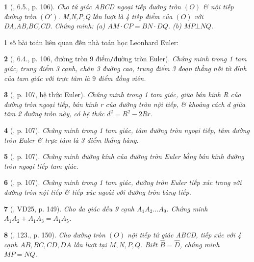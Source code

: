 \documentclass{article}
\newtheorem{baitoan}{}
\begin{document}
\begin{baitoan}[\cite{Binh_boi_duong_Toan_9_tap_2}, 6.5., p. 106]
	Cho tứ giác ABCD ngoại tiếp đường tròn $(O)$ \& nội tiếp đường tròn $(O')$. M,N,P,Q lần lượt là 4 tiếp điểm của $(O)$ với DA,AB,BC,CD. Chứng minh: (a) $AM\cdot CP = BN\cdot DQ$. (b) $MP\bot NQ$.
\end{baitoan}
1 số bài toán liên quan đến nhà toán học Leonhard Euler:

\begin{baitoan}[\cite{Binh_boi_duong_Toan_9_tap_2}, 6.4., p. 106, đường tròn 9 điểm{\tt/}đường tròn Euler]
	Chứng minh trong 1 tam giác, trung điểm 3 cạnh, chân 3 đường cao, trung điểm 3 đoạn thẳng nối từ đỉnh của tam giác với trực tâm là $9$ điểm đồng viên.
\end{baitoan}

\begin{baitoan}[\cite{Binh_boi_duong_Toan_9_tap_2}, p. 107, hệ thức Euler]
	Chứng minh trong 1 tam giác, giữa bán kính R của đường tròn ngoại tiếp, bán kính r của đường tròn nội tiếp, \& khoảng cách d giữa tâm 2 đường tròn này, có hệ thức $d^2 = R^2 - 2Rr$.
\end{baitoan}

\begin{baitoan}[\cite{Binh_boi_duong_Toan_9_tap_2}, p. 107]
	Chứng minh trong 1 tam giác, tâm đường tròn ngoại tiếp, tâm đường tròn Euler \& trực tâm là 3 điểm thẳng hàng.
\end{baitoan}

\begin{baitoan}[\cite{Binh_boi_duong_Toan_9_tap_2}, p. 107]
	Chứng minh đường kính của đường tròn Euler bằng bán kính đường tròn ngoại tiếp tam giác.
\end{baitoan}

\begin{baitoan}[\cite{Binh_boi_duong_Toan_9_tap_2}, p. 107]
	Chứng minh trong 1 tam giác, đường tròn Euler tiếp xúc trong với đường tròn nội tiếp \& tiếp xúc ngoài với đường tròn bàng tiếp.
\end{baitoan}

\begin{baitoan}[\cite{Tuyen_Toan_9_old}, VD25, p. 149]
	Cho đa giác đều 9 cạnh $A_1A_2\ldots A_9$. Chứng minh $A_1A_2 + A_1A_3 = A_1A_5$.
\end{baitoan}

\begin{baitoan}[\cite{Tuyen_Toan_9_old}, 123., p. 150]
	Cho đường tròn $(O)$ nội tiếp tứ giác ABCD, tiếp xúc với 4 cạnh $AB,BC,CD,DA$ lần lượt tại $M,N,P,Q$. Biết $\widehat{B} = \widehat{D}$, chứng minh $MP = NQ$.
\end{baitoan}
\end{document}
